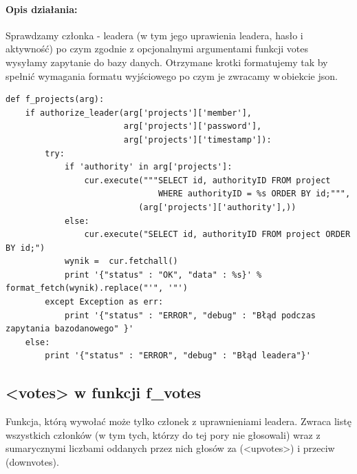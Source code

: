 \documentclass{article}
\begin{document}
\paragraph{Opis działania: }
Sprawdzamy członka - leadera (w tym jego uprawienia leadera, hasło i aktywność) po czym zgodnie z opcjonalnymi argumentami funkcji votes wysyłamy zapytanie do bazy danych.
Otrzymane krotki formatujemy tak by spełnić wymagania formatu wyjściowego po czym je zwracamy w\,obiekcie json. \newline
\begin{verbatim}
def f_projects(arg):
    if authorize_leader(arg['projects']['member'], 
                        arg['projects']['password'], 
                        arg['projects']['timestamp']):
        try:
            if 'authority' in arg['projects']:
                cur.execute("""SELECT id, authorityID FROM project 
                               WHERE authorityID = %s ORDER BY id;""",
                           (arg['projects']['authority'],))
            else:
                cur.execute("SELECT id, authorityID FROM project ORDER BY id;")
            wynik =  cur.fetchall()
            print '{"status" : "OK", "data" : %s}' % format_fetch(wynik).replace("'", '"')
        except Exception as err:
            print '{"status" : "ERROR", "debug" : "Błąd podczas zapytania bazodanowego" }' 
    else:
        print '{"status" : "ERROR", "debug" : "Błąd leadera"}'  
\end{verbatim}







\newpage
\subsection{<votes> w funkcji f\_votes }
Funkcja, którą wywołać może tylko członek z uprawnieniami leadera.
Zwraca listę wszystkich członków (w tym tych, którzy do tej pory nie głosowali) wraz z sumarycznymi liczbami oddanych przez nich głosów za (<upvotes>) i przeciw (downvotes).
\end{document}
